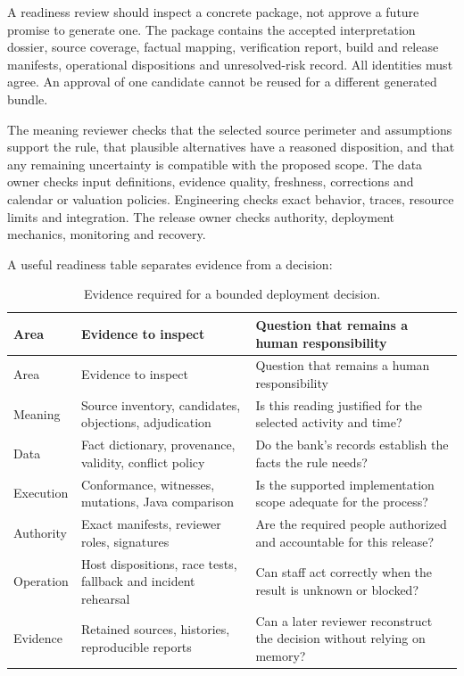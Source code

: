 A readiness review should inspect a concrete package, not approve a future promise
to generate one. The package contains the accepted interpretation dossier, source
coverage, factual mapping, verification report, build and release manifests,
operational dispositions and unresolved-risk record. All identities must agree.
An approval of one candidate cannot be reused for a different generated bundle.

The meaning reviewer checks that the selected source perimeter and assumptions
support the rule, that plausible alternatives have a reasoned disposition, and
that any remaining uncertainty is compatible with the proposed scope. The data
owner checks input definitions, evidence quality, freshness, corrections and
calendar or valuation policies. Engineering checks exact behavior, traces,
resource limits and integration. The release owner checks authority, deployment
mechanics, monitoring and recovery.


A useful readiness table separates evidence from a decision:
\begin{longtable}{@{}P{31mm}P{60mm}P{57mm}@{}}
\caption{Evidence required for a bounded deployment decision.}\\
\toprule
Area & Evidence to inspect & Question that remains a human responsibility\\\midrule\endfirsthead
\toprule Area & Evidence to inspect & Question that remains a human responsibility\\\midrule\endhead
Meaning & Source inventory, candidates, objections, adjudication & Is this reading justified for the selected activity and time?\\
Data & Fact dictionary, provenance, validity, conflict policy & Do the bank's records establish the facts the rule needs?\\
Execution & Conformance, witnesses, mutations, Java comparison & Is the supported implementation scope adequate for the process?\\
Authority & Exact manifests, reviewer roles, signatures & Are the required people authorized and accountable for this release?\\
Operation & Host dispositions, race tests, fallback and incident rehearsal & Can staff act correctly when the result is unknown or blocked?\\
Evidence & Retained sources, histories, reproducible reports & Can a later reviewer reconstruct the decision without relying on memory?\\
\bottomrule
\end{longtable}

